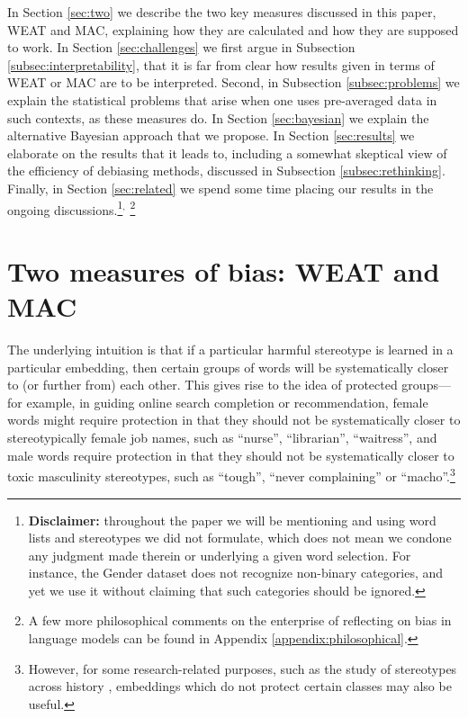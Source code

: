 \documentclass{clv3}
\begin{document}
In Section \ref{sec:two} we describe the two key measures discussed in
this paper, \textsf{WEAT} and \textsf{MAC}, explaining how they are
calculated and how they are supposed to work. In Section
\ref{sec:challenges} we first argue in Subsection
\ref{subsec:interpretability}, that it is far from clear how results
given in terms of \textsf{WEAT} or \textsf{MAC} are to be interpreted.
Second, in Subsection \ref{subsec:problems} we explain the statistical
problems that arise when one uses pre-averaged data in such contexts, as
these measures do. In Section \ref{sec:bayesian} we explain the
alternative Bayesian approach that we propose. In Section
\ref{sec:results} we elaborate on the results that it leads to,
including a somewhat skeptical view of the efficiency of debiasing
methods, discussed in Subsection \ref{subsec:rethinking}. Finally, in
Section \ref{sec:related} we spend some time placing our results in the
ongoing discussions.\footnote{\textbf{Disclaimer:} throughout the paper
  we will be mentioning and using word lists and stereotypes we did not
  formulate, which does not mean we condone any judgment made therein or
  underlying a given word selection. For instance, the Gender dataset
  does not recognize non-binary categories, and yet we use it without
  claiming that such categories should be ignored.}$^{, }$ \footnote{A few more philosophical comments on the enterprise of reflecting on bias in language models can be found in Appendix \ref{appendix:philosophical}.}




\hypertarget{two-measures-of-bias-weat-and-mac}{%
\section{Two measures of bias: WEAT and
MAC}\label{two-measures-of-bias-weat-and-mac}}

\label{sec:two}

The underlying intuition is that if a particular harmful stereotype is
learned in a particular embedding, then certain groups of words will be
systematically closer to (or further from) each other. This gives rise
to the idea of protected groups---for example, in guiding online search
completion or recommendation, female words might require protection in
that they should not be systematically closer to stereotypically female
job names, such as ``nurse'', ``librarian'', ``waitress'', and male
words require protection in that they should not be systematically
closer to toxic masculinity stereotypes, such as ``tough'', ``never
complaining'' or ``macho''.\footnote{However, for some research-related
  purposes, such as the study of stereotypes across history \citep{Garg2018years},
  embeddings which do not protect certain classes may also be useful.}
\end{document}
